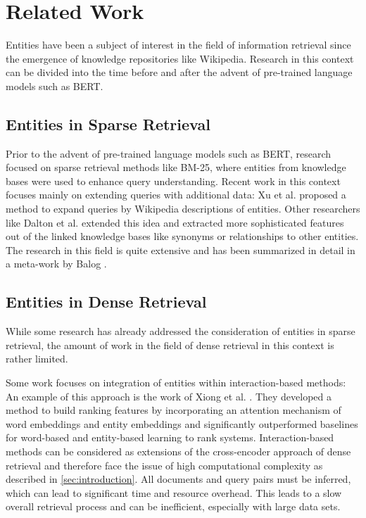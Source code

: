 \section{Related Work}\label{sec:related_work}

Entities have been a subject of interest in the field of information retrieval since the emergence of knowledge repositories like Wikipedia. Research in this context can be divided into the time before and after the advent of pre-trained language models such as BERT.

\subsection{Entities in Sparse Retrieval}\label{subsec:sparse}

Prior to the advent of pre-trained language models such as BERT, research focused on sparse retrieval methods like BM-25, where entities from knowledge bases were used to enhance query understanding. Recent work in this context focuses mainly on extending queries with additional data: Xu et al. \cite{xu2009query} proposed a method to expand queries by Wikipedia descriptions of entities. Other researchers like Dalton et al. \cite{dalton2014entity} extended this idea and extracted more sophisticated features out of the linked knowledge bases like synonyms or relationships to other entities. The research in this field is quite extensive and has been summarized in detail in a meta-work by Balog \cite{balog2018entity}.

\subsection{Entities in Dense Retrieval}\label{subsec:dense}

While some research has already addressed the consideration of entities in sparse retrieval, the amount of work in the field of dense retrieval in this context is rather limited. 

Some work focuses on integration of entities within interaction-based methods: An example of this approach is the work of Xiong et al. \cite{xiong2017word,xiong2017word_2}. They developed a method to build ranking features by incorporating an attention mechanism of word embeddings and entity embeddings and significantly outperformed baselines for word-based and entity-based learning to rank systems. Interaction-based methods can be considered as extensions of the cross-encoder approach of dense retrieval and therefore face the issue of high computational complexity as described in \autoref{sec:introduction}. All documents and query pairs must be inferred, which can lead to significant time and resource overhead. This leads to a slow overall retrieval process and can be inefficient, especially with large data sets.

